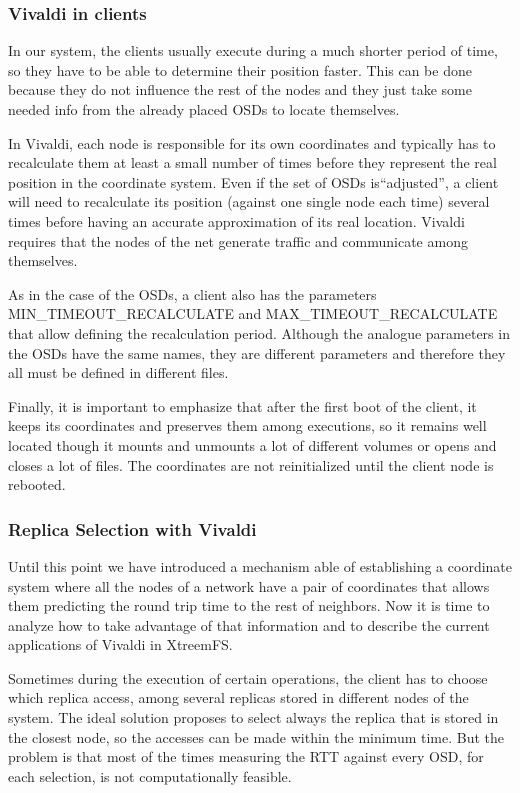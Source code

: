 \subsubsection{Vivaldi in clients}

In our system, the clients usually execute during a much shorter period of time,
so they have to be able to determine their position faster. This can be done
because they do not influence the rest of the nodes and they just take some
needed info from the already placed OSDs to locate themselves.

In Vivaldi, each node is responsible for its own coordinates and typically has to
recalculate them at least a small number of times before they represent the real
position in the coordinate system. Even if the set of OSDs is``adjusted'', a
client will need to recalculate its position (against one single node each time)
several times before having an accurate approximation of its real location.
Vivaldi requires that the nodes of the net generate traffic and communicate
among themselves.

As in the case of the OSDs, a client also has the parameters
MIN\_\-TIMEOUT\_\-RECALCULATE and MAX\_\-TIMEOUT\_\-RECALCULATE that allow defining the
recalculation period. Although the analogue parameters in the OSDs have the same
names, they are different parameters and therefore they all must be defined in
different files.

Finally, it is important to emphasize that after the first boot of the client,
it keeps its coordinates and preserves them among executions, so it remains well
located though it mounts and unmounts a lot of different volumes or opens and
closes a lot of files. The coordinates are not reinitialized until the client
node is rebooted.

\subsubsection{Replica Selection with Vivaldi}

Until this point we have introduced a mechanism able of establishing a
coordinate system where all the nodes of a network have a pair of coordinates
that allows them predicting the round trip time to the rest of neighbors. Now it
is time to analyze how to take advantage of that information and to describe the
current applications of Vivaldi in XtreemFS.

Sometimes during the execution of certain operations, the client has to choose
which replica access, among several replicas stored in different nodes of the
system. The ideal solution proposes to select always the replica that is stored
in the closest node, so the accesses can be made within the minimum time. But
the problem is that most of the times measuring the RTT against every OSD, for
each selection, is not computationally feasible.

